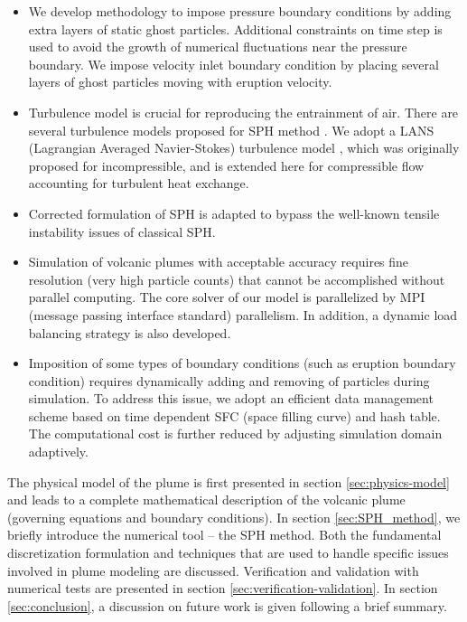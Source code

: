 \documentclass[journal abbreviation, manuscript]{copernicus}
\begin{document}
\begin{itemize}
\item We develop methodology to impose pressure boundary conditions by adding extra layers of static ghost particles. Additional constraints on time step is used to avoid the growth of numerical fluctuations near the pressure boundary. We impose velocity inlet boundary condition by placing several layers of ghost particles moving with eruption velocity. 
\item Turbulence model is crucial for reproducing the entrainment of air. There are several turbulence models proposed for SPH method \citep{issa2005numerical,violeau2007numerical}. We adopt a LANS (Lagrangian Averaged Navier-Stokes) turbulence model \citep{monaghan2011turbulence}, which was originally proposed for incompressible, and is extended here for compressible flow accounting for turbulent heat exchange. 
\item Corrected formulation of SPH \citep{chen1999improvement} is adapted to bypass the well-known tensile instability issues of classical SPH.
\item Simulation of volcanic plumes with acceptable accuracy requires fine resolution (very high particle counts) that cannot be accomplished without parallel computing. The core solver of our model is parallelized by MPI (message passing interface standard) parallelism. In addition, a dynamic load balancing strategy is also developed. 
\item Imposition of some types of boundary conditions (such as eruption boundary condition) requires dynamically adding and removing of particles during simulation. To address this issue, we adopt an efficient data management scheme based on time dependent SFC (space filling curve) and hash table. The computational cost is further reduced by adjusting simulation domain adaptively.
\end{itemize}

The physical model of the plume is first presented in section \ref{sec:physics-model} and leads to a complete mathematical description of the volcanic plume (governing equations and boundary conditions). In section \ref{sec:SPH_method}, we  briefly introduce the numerical tool -- the SPH method. Both the fundamental discretization formulation and techniques that are used to handle specific issues involved in plume modeling are discussed. Verification and validation with numerical tests are presented in section \ref{sec:verification-validation}. In section \ref{sec:conclusion}, a discussion on future work is given following a brief summary.
\end{document}
